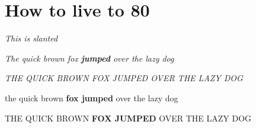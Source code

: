 \documentclass[15pt, landscape, oneside]{scrbook}
\begin{document}
	\chapter*{How to live to 80}

	\textsl{This is slanted}
	
	\textit{The quick brown fox \textbf{jumped} over the lazy dog} 
	
	\textit{THE QUICK BROWN FOX JUMPED OVER THE LAZY DOG}
	
	the quick brown \textbf{fox jumped} over the lazy dog
	
	THE QUICK BROWN \textbf{FOX JUMPED} OVER THE LAZY DOG
	
	
	
	
	
	\lipsum[20-23]
	
	\textit{\lipsum[30-33]}
\end{document}
